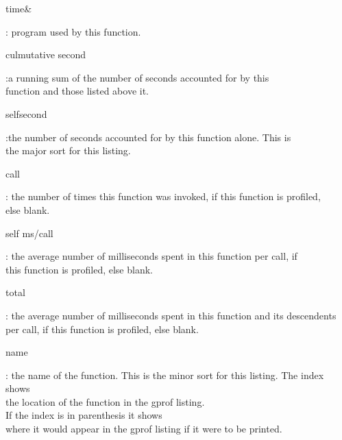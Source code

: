 \documentclass[11pt]{report}
\begin{document}
\begin{tabbing} 
\begin{bf}time\&\end{bf}:  program used by this function.\\
\begin{bf}culmutative second\end{bf}:a running sum of the number of seconds accounted for by this\\ function and those listed above it.\\
\begin{bf}selfsecond\end{bf}:the number of seconds accounted for by this function alone. This is \\the major sort for this listing. \\
\begin{bf}call\end{bf}: the number of times this function was invoked, if this function is profiled,\\ else blank.\\

\begin{bf}self ms/call\end{bf}: the average number of milliseconds spent in this function per call, if\\ this function is profiled, else blank.\\

\begin{bf}total\end{bf}: the average number of milliseconds spent in this function and its descendents \\per call, if this function is profiled, else blank.\\

\begin{bf}name\end{bf}: the name of the function.  This is the minor sort for this listing. The index shows\\ the location of the function in the gprof listing.\\ If the index is in parenthesis it shows\\ where it would appear in the gprof listing if it were to be printed.\\
\end{tabbing}
\end{document}
